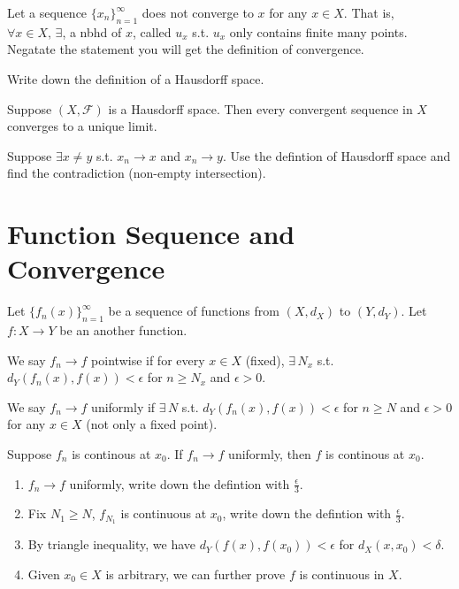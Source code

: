 \documentclass[12pt]{article}
\begin{document}
\begin{exercise}
Let a sequence $\{x_n\}^\infty_{n=1}$ does not converge to $x$ for any $x\in X$.
That is, $\forall x\in X,\, \exists$, a nbhd of $x$, called $u_x$ s.t. $u_x$ only contains finite many points.
Negatate the statement you will get the definition of convergence. 
\end{exercise}

\begin{exercise}
    Write down the definition of a Hausdorff space.
\end{exercise}

\begin{theorem}
    Suppose $(X,\mathcal{F})$ is a Hausdorff space. Then every convergent sequence in $X$ converges to a unique limit.
\end{theorem}

\begin{pfbox}
    Suppose $\exists x\neq y$ s.t. $x_n\rightarrow x$ and $x_n\rightarrow y$. Use the defintion of Hausdorff space and find the contradiction (non-empty intersection).
\end{pfbox}



\section{Function Sequence and Convergence}

Let $\{f_n(x)\}^\infty_{n=1}$ be a sequence of functions from $(X,d_X)$ to $(Y,d_Y)$.
Let $f:X\rightarrow Y$ be an another function.
\begin{definition}
We say $f_n\rightarrow f$ pointwise if for every $x\in X$ (fixed), $\exists\,N_x$ s.t. $d_Y(f_n(x), f(x))<\epsilon$ for $n\geq N_x$ and $\epsilon>0$.
\end{definition}

\begin{definition}
We say $f_n\rightarrow f$ uniformly if $\exists\, N$ s.t. $d_Y(f_n(x), f(x))<\epsilon$ for $n\geq N$ and $\epsilon>0$ for any $x\in X$ (not only a fixed point).
\end{definition}

\begin{theorem}
    Suppose $f_n$ is continous at $x_0$. If $f_n\rightarrow f$ uniformly, then $f$ is continous at $x_0$.
\end{theorem}

\begin{pfbox}
    \begin{enumerate}
        \item $f_n\rightarrow f$ uniformly, write down the defintion with $\frac{\epsilon}{3}$.
        \item Fix $N_1\geq N$, $f_{N_1}$ is continuous at $x_0$, write down the defintion with $\frac{\epsilon}{3}$.
        \item By triangle inequality, we have $d_Y(f(x), f(x_0))<\epsilon$ for $d_X(x,x_0)<\delta$.
        \item Given $x_0\in X$ is arbitrary, we can further prove $f$ is continuous in $X$.
    \end{enumerate}
\end{pfbox}
\end{document}
